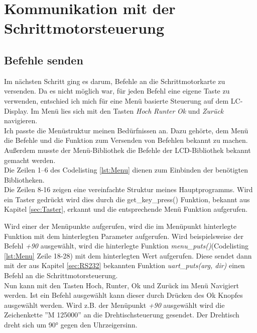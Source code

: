\section{Kommunikation mit der Schrittmotorsteuerung}
\label{sec:Komm_SM}
\subsection{Befehle senden}
\label{sec:menu}
Im nächsten Schritt ging es darum, Befehle an die Schrittmotorkarte zu versenden. Da es nicht möglich war, für jeden Befehl eine eigene Taste zu verwenden, 
entschied ich mich für eine Menü basierte Steuerung auf dem LC-Display. Im Menü lies sich mit den Tasten \emph{Hoch} \emph{Runter} \emph{Ok} und \emph{Zurück} navigieren.\\
Ich passte die Menüstruktur meinen Bedürfnissen an. Dazu gehörte, dem Menü die Befehle und die Funktion zum Versenden von Befehlen bekannt zu machen.
Außerdem musste der Menü-Bibliothek die Befehle der LCD-Bibliothek bekannt gemacht werden.\\
Die Zeilen 1--6 des Codelisting \ref{lst:Menu} dienen zum Einbinden der benötigten Bibliotheken.\\
Die Zeilen 8-16 zeigen eine vereinfachte Struktur meines  Hauptprogramms. Wird ein Taster gedrückt wird dies durch die get\_key\_press() Funktion, bekannt aus Kapitel \ref{sec:Taster}, erkannt und die entsprechende Menü Funktion aufgerufen.
\lstset{language=C, basicstyle=\footnotesize, showstringspaces=false, tabsize=8}

Wird einer der Menüpunkte aufgerufen, wird die im Menüpunkt hinterlegte Funktion mit dem hinterlegten Parameter aufgerufen.
Wird beispielsweise der Befehl \emph{+90} ausgewählt, wird die hinterlegte Funktion \emph{menu\_puts()}(Codelisting \ref{lst:Menu} Zeile 18-28) mit dem hinterlegten Wert aufgerufen. Diese sendet dann mit der aus Kapitel \ref{sec:RS232} bekannten Funktion \emph{uart\_puts(arg, dir)} einen Befehl an die Schrittmotorsteuerung.\\
Nun kann mit den Tasten Hoch, Runter, Ok und Zurück im Menü Navigiert werden. Ist ein Befehl ausgewählt kann dieser durch Drücken des Ok Knopfes ausgewählt werden. Wird z.B. der Menüpunkt \emph{+90} ausgewählt wird die Zeichenkette ''M 125000'' an die Drehtischsteuerung gesendet. Der Drehtisch dreht sich um 90° gegen den Uhrzeigersinn.
\lstset{language=C, basicstyle=\footnotesize, showstringspaces=false, tabsize=8}

